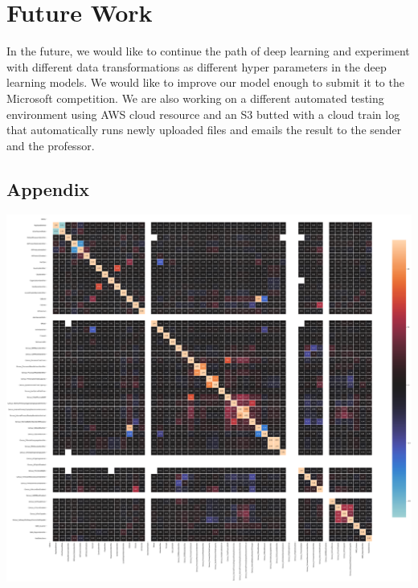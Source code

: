 \documentclass[sigconf]{acmart}
\begin{document}
\section{Future Work}
In the future, we would like to continue the path of deep learning and experiment with different data transformations as different hyper parameters in the deep learning models. We would like to improve our model enough to submit it to the Microsoft competition. We are also working on a different automated testing environment using AWS cloud resource and an S3 butted with a cloud train log that automatically runs newly uploaded files and emails the result to the sender and the professor. 


\subsection{Appendix}

\label{lytle:correlation}
\includegraphics[scale=0.2]{correlation.PNG}

\end{document}
